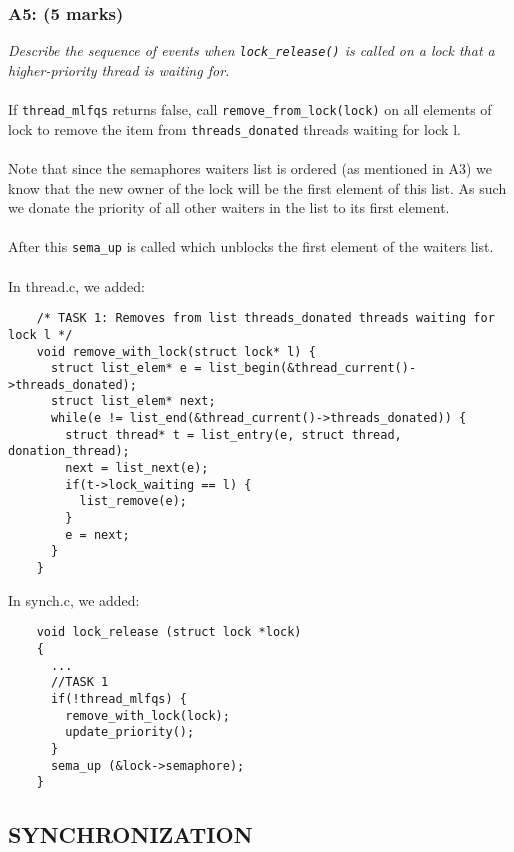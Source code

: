 \documentclass{article}
\begin{document}
\subsubsection*{A5: (5 marks) }
\textit{Describe the sequence of events when \texttt{lock\_release()} is called on a lock that a higher-priority thread is waiting for.}
\\ \\
If \texttt{thread\_mlfqs} returns false, call \texttt{remove\_from\_lock(lock)} on all elements of lock to remove the item from \texttt{threads\_donated} threads waiting for lock l.
\\ \\
Note that since the semaphores waiters list is ordered (as mentioned in A3) we know that the new owner of the lock will be the first element of this list. As such we donate the priority of all other waiters in the list to its first element.
\\ \\
After this \texttt{sema\_up} is called which unblocks the first element of the waiters list.
\\ \\
In thread.c, we added:
\begin{lstlisting}
    /* TASK 1: Removes from list threads_donated threads waiting for lock l */
    void remove_with_lock(struct lock* l) {
      struct list_elem* e = list_begin(&thread_current()->threads_donated);
      struct list_elem* next;
      while(e != list_end(&thread_current()->threads_donated)) {
        struct thread* t = list_entry(e, struct thread, donation_thread);
        next = list_next(e);
        if(t->lock_waiting == l) {
          list_remove(e);
        }
        e = next;
      }
    }
\end{lstlisting}

In synch.c, we added:
\begin{lstlisting}
    void lock_release (struct lock *lock)
    {
      ...
      //TASK 1
      if(!thread_mlfqs) {
        remove_with_lock(lock);
        update_priority();
      }
      sema_up (&lock->semaphore);
    }

\end{lstlisting}



\subsection{SYNCHRONIZATION}
\end{document}
